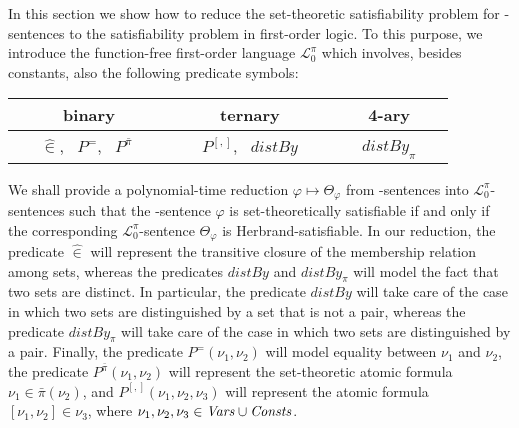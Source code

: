 \documentclass[a4paper]{llncs}
\newcommand{\Elpizero}{\ensuremath{\mathcal{L}_{0}^{\pi}}\xspace}
\newcommand{\nonpairssym}{\bar{\pi}}
\newcommand{\nonpairs}[1]{\nonpairssym(#1)}
\begin{document}
\newcommand{\distPbyS}{\mathit{distBy}_{\pi}}
\newcommand{\distbyS}{\mathit{distBy}}
\newcommand{\distPS}{\mathsf{dist}_{\pi}}
\newcommand{\distS}{\mathsf{dist}}
\newcommand{\CPpizeroS}{P^{\bar{\pi}}}
\newcommand{\PpizeroS}{P^{[,]}}
\newcommand{\EqPpizeroS}{P^{=}}

\newcommand{\memhatP}{\widehat{\in}}
\newcommand{\memhat}[2]{#1 \memhatP #2}
\newcommand{\dist}[2]{\distS(#1,#2)}
\newcommand{\distP}[2]{\distPS(#1,#2)}
\newcommand{\distby}[3]{\distbyS(#1,#2,#3)}
\newcommand{\distPby}[4]{\distPbyS(#1,#2,#3,#4)}



In this section we show how to reduce the set-theoretic 
satisfiability problem for  \Forallpizero-sentences to the 
satisfiability problem in first-order logic. To this purpose, we 
introduce the function-free first-order language \Elpizero which 
involves, besides constants, also the following
predicate symbols:
\begin{center}
\begin{tabular}[m]{|c|c|c|}
     \hline
     binary & ternary & 4-ary \\
     \hline
~~~$\memhatP$, ~$\EqPpizeroS$, ~$\CPpizeroS$
~~~  &
%
~~~$\PpizeroS$,  ~$\distbyS$~~~ &
%
~~~$\distPbyS$~~~\\
\hline
\end{tabular}
\end{center}


We shall provide a polynomial-time reduction $\varphi \mapsto
\Theta_{\varphi}$ from \Forallpizero-sentences into \Elpizero-sentences
such that the \Forallpizero-sentence $\varphi$ is set-theoretically
satisfiable if and only if the corresponding \Elpizero-sentence 
$\Theta_{\varphi}$ is Herbrand-satisfiable.
%
In our reduction, the predicate $\memhatP$ will represent the
transitive closure of the membership relation among sets, whereas the
predicates
$\distbyS$ and $\distPbyS$ will model the fact that two sets are 
distinct.  In particular, the
predicate
$\distbyS$ will take care of the case in which
two sets are distinguished by a set that is not a pair,
whereas the predicate
$\distPbyS$ will take care of the
case in which two sets are distinguished by a pair.  Finally, the predicate
$\EqPpizeroS(\nu_1,\nu_2)$ will model equality between
$\nu_1$ and $\nu_2$, the predicate $\CPpizeroS(\nu_1, \nu_2)$
will represent the set-theoretic atomic formula $\nu_1 \in \nonpairs{\nu_2}$,
and $\PpizeroS(\nu_1, \nu_2, \nu_3)$ will represent the atomic 
formula $[\nu_1, \nu_2] \in \nu_3$, where $\nu_1,\nu_2,\nu_3 \in 
\mathit{Vars} \cup \mathit{Consts}$.
\end{document}
